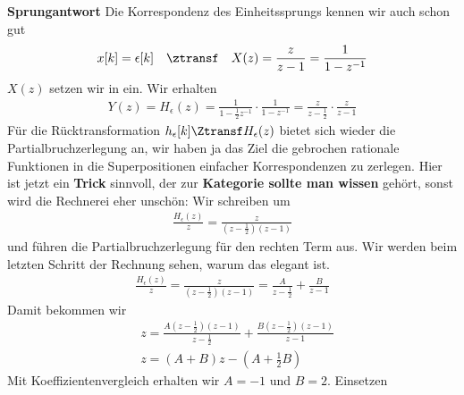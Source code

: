 \begin{ExCalc}
\textbf{Sprungantwort}
Die Korrespondenz des Einheitssprungs kennen wir auch schon gut
\begin{align}
x[k]=\epsilon[k] \quad\ztransf\quad X(z) = \frac{z}{z-1} = \frac{1}{1-z^{-1}}
\end{align}
$X(z)$ setzen wir in  ein. Wir erhalten
\begin{align}
Y(z) = H_\epsilon(z) = \frac{1}{1-\frac{1}{2} z^{-1}} \cdot \frac{1}{1-z^{-1}} =
\frac{z}{z-\frac{1}{2}} \cdot \frac{z}{z-1}
\end{align}
Für die Rücktransformation $h_\epsilon[k] \Ztransf H_\epsilon(z)$ bietet sich
wieder die Partialbruchzerlegung an, wir haben ja das Ziel die gebrochen rationale
Funktionen in die Superpositionen einfacher Korrespondenzen zu zerlegen.
Hier ist jetzt ein \textbf{Trick} sinnvoll, der zur
\textbf{Kategorie sollte man wissen} gehört,
sonst wird die Rechnerei eher unschön:
Wir schreiben um
\begin{align}
\frac{H_\epsilon(z)}{z} = \frac{z}{(z-\frac{1}{2})(z-1)}
\end{align}
und führen die Partialbruchzerlegung für den rechten Term aus. Wir werden beim letzten Schritt der
Rechnung sehen, warum das elegant ist.
\begin{align}
\frac{H_\epsilon(z)}{z} = \frac{z}{(z-\frac{1}{2})(z-1)} = \frac{A}{z-\frac{1}{2}} + \frac{B}{z-1}
\end{align}
Damit bekommen wir
\begin{align}
&z = \frac{A(z-\frac{1}{2})(z-1)}{z-\frac{1}{2}} + \frac{B (z-\frac{1}{2})(z-1)}{z-1}\\
&z = (A+B) z - (A + \frac{1}{2}B)
\end{align}
Mit Koeffizientenvergleich erhalten wir $A = -1$ und $B=2$.
Einsetzen
\begin{align}

\end{align}
\end{ExCalc}
